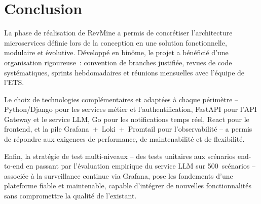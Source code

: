 \section{Conclusion}

La phase de réalisation de RevMine a permis de concrétiser l'architecture microservices définie
lors de la conception en une solution fonctionnelle, modulaire et évolutive. Développé en binôme,
le projet a bénéficié d'une organisation rigoureuse~: convention de branches justifiée, revues de
code systématiques, sprints hebdomadaires et réunions mensuelles avec l'équipe de l'ETS.

Le choix de technologies complémentaires et adaptées à chaque périmètre -- Python/Django pour les
services métier et l'authentification, FastAPI pour l'API Gateway et le service LLM, Go pour les
notifications temps réel, React pour le frontend, et la pile Grafana~+~Loki~+~Promtail pour
l'observabilité -- a permis de répondre aux exigences de performance, de maintenabilité et de
flexibilité.

Enfin, la stratégie de test multi-niveaux -- des tests unitaires aux scénarios end-to-end en
passant par l'évaluation empirique du service LLM sur 500~scénarios -- associée à la surveillance
continue via Grafana, pose les fondements d'une plateforme fiable et maintenable, capable
d'intégrer de nouvelles fonctionnalités sans compromettre la qualité de l'existant.
